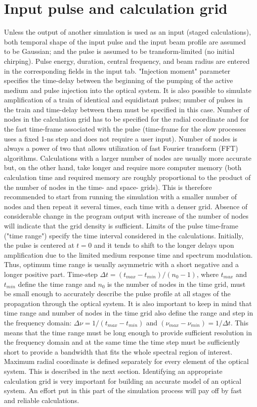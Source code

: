 \documentclass{report}
\begin{document}
\section{Input pulse and calculation grid}
Unless the output of another simulation is used as an input (staged calculations), both temporal shape of the input pulse and the input beam profile are assumed to be Gaussian; and the pulse is assumed to be transform-limited (no initial chirping). Pulse energy, duration, central frequency, and beam radius are entered in the corresponding fields in the input tab. "Injection moment" parameter specifies the time-delay between the beginning of the pumping of the active medium and pulse injection into the optical system. It is also possible to simulate amplification of a train of identical and equidistant pulses; number of pulses in the train and time-delay between them must be specified in this case.
Number of nodes in the calculation grid has to be specified for the radial coordinate and for the fast time-frame associated with the pulse (time-frame for the slow processes uses a fixed 1-ns step and does not require a user input). Number of nodes is always a power of two that allows utilization of fast Fourier transform (FFT) algorithms. Calculations with a larger number of nodes are usually more accurate but, on the other hand, take longer and require more computer memory (both calculation time and required memory are roughly proportional to the product of the number of  nodes in the time- and space- grids). This is therefore recommended to start from running the simulation with a smaller number of nodes and then repeat it several times, each time with a denser grid. Absence of considerable change in the program output with increase of the number of nodes will indicate that the grid density is sufficient.
Limits of the pulse time-frame ("time range") specify the time interval considered in the calculations. Initially, the pulse is centered at $t=0$ and it tends to shift to the longer delays upon amplification due to the limited medium response time and spectrum modulation. Thus, optimum time range is usually asymmetric with a short negative and a longer positive part. Time-step $\Delta t=(t_{max}-t_{min})/(n_0-1)$, where $t_{max}$ and $t_{min}$ define the time range and $n_0$ is the number of nodes in the time grid, must be small enough to accurately describe the pulse profile at all stages of the propagation through the optical system. It is also important to keep in mind that time range and number of nodes in the time grid also define the range and step in the frequency domain: $\Delta\nu=1/(t_{max}-t_{min})$ and $(\nu_{max}-\nu_{min})=1/\Delta t$. This means that the time range must be long enough to provide sufficient resolution in the frequency domain and at the same time the time step must be sufficiently short to provide a bandwidth that fits the whole spectral region of interest.
Maximum radial coordinate is defined separately for every element of the optical system. This is described in the next section.
Identifying an appropriate calculation grid is very important for building an accurate model of an optical system. An effort put in this part of the simulation process will pay off by fast and reliable calculations.
\end{document}
